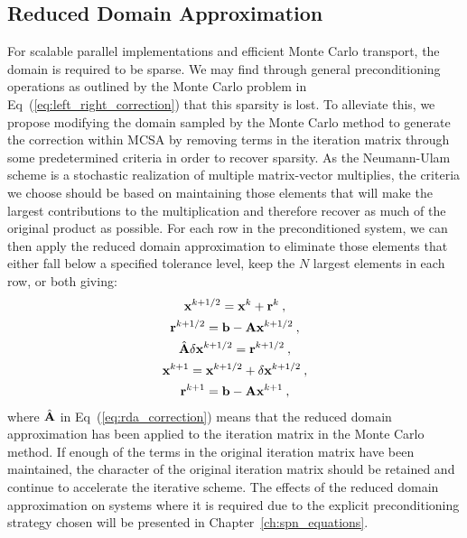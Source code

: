 \subsection{Reduced Domain Approximation}
\label{subsec:reduced_domain_approximation}
For scalable parallel implementations and efficient Monte Carlo
transport, the domain is required to be sparse. We may find through
general preconditioning operations as outlined by the Monte Carlo
problem in Eq~(\ref{eq:left_right_correction}) that this sparsity is
lost. To alleviate this, we propose modifying the domain sampled by
the Monte Carlo method to generate the correction within MCSA by
removing terms in the iteration matrix through some predetermined
criteria in order to recover sparsity. As the Neumann-Ulam scheme is a
stochastic realization of multiple matrix-vector multiplies, the
criteria we choose should be based on maintaining those elements that
will make the largest contributions to the multiplication and
therefore recover as much of the original product as possible. For
each row in the preconditioned system, we can then apply the reduced
domain approximation to eliminate those elements that either fall
below a specified tolerance level, keep the $N$ largest elements in
each row, or both giving:
\begin{subequations}
  \begin{gather}
    \mathbf{x}^{k+1/2} = \mathbf{x}^k + \mathbf{r}^k\:,\\
    \mathbf{r}^{k+1/2} = \mathbf{b} - \mathbf{A}\mathbf{x}^{k+1/2}\:,\\
    \hat{\mathbf{A}}\delta\mathbf{x}^{k+1/2} = \mathbf{r}^{k+1/2}\:, 
    \label{eq:rda_correction}\\
    \mathbf{x}^{k+1} = \mathbf{x}^{k+1/2} + \delta \mathbf{x}^{k+1/2}\:,\\
    \mathbf{r}^{k+1} = \mathbf{b} - \mathbf{A}\mathbf{x}^{k+1}\:,
  \end{gather}
  \label{eq:rda_mcsa}
\end{subequations}
where $\hat{\mathbf{A}}$ in Eq~(\ref{eq:rda_correction}) means that the
reduced domain approximation has been applied to the iteration matrix
in the Monte Carlo method. If enough of the terms in the original
iteration matrix have been maintained, the character of the original
iteration matrix should be retained and continue to accelerate the
iterative scheme. The effects of the reduced domain approximation on
systems where it is required due to the explicit preconditioning
strategy chosen will be presented in Chapter~\ref{ch:spn_equations}.

\clearpage
